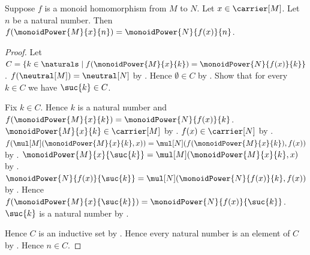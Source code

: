 \begin{theorem}\label{monoid_hom_preserves_power}
    Suppose $f$ is a monoid homomorphism from $M$ to $N$.
    Let $x\in\carrier[M]$.
    Let $n$ be a natural number.
    Then $f(\monoidPower{M}{x}{n})=
        \monoidPower{N}{f(x)}{n}$.
\end{theorem}
\begin{proof}
    Let $C=\{k\in\naturals\mid
        f(\monoidPower{M}{x}{k})=
            \monoidPower{N}{f(x)}{k}\}$.
    $f(\neutral[M])=\neutral[N]$ by .
    Hence $\emptyset\in C$ by
        .
    Show that for every $k\in C$ we have $\suc{k}\in C$.
    \begin{subproof}
        Fix $k\in C$.
        Hence $k$ is a natural number and
            $f(\monoidPower{M}{x}{k})=
                \monoidPower{N}{f(x)}{k}$.
        $\monoidPower{M}{x}{k}\in\carrier[M]$ by
            .
        $f(x)\in\carrier[N]$ by .
        $f(\mul[M](\monoidPower{M}{x}{k},x))=
            \mul[N](f(\monoidPower{M}{x}{k}),f(x))$ by
            .
        $\monoidPower{M}{x}{\suc{k}}=
            \mul[M](\monoidPower{M}{x}{k},x)$ by
            .
        $\monoidPower{N}{f(x)}{\suc{k}}=
            \mul[N](\monoidPower{N}{f(x)}{k},f(x))$ by
            .
        Hence $f(\monoidPower{M}{x}{\suc{k}})=
            \monoidPower{N}{f(x)}{\suc{k}}$.
        $\suc{k}$ is a natural number by .
    \end{subproof}
    Hence $C$ is an inductive set by .
    Hence every natural number is an element of $C$ by
        .
    Hence $n\in C$.
\end{proof}
